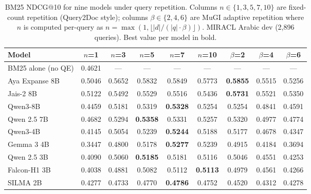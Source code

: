 \begin{table}[htbp]
    \centering
    \caption[BM25 NDCG@10 under query repetition, full sweep]{BM25 NDCG@10 for nine models under query repetition. Columns $n \in \{1, 3, 5, 7, 10\}$ are fixed-count repetition (Query2Doc style); columns $\beta \in \{2, 4, 6\}$ are MuGI adaptive repetition where $n$ is computed per-query as $n = \max(1, \lfloor |d| / (|q| \cdot \beta) \rfloor)$. MIRACL Arabic dev (2,896 queries). Best value per model in bold.}
    \label{tab:bm25_repetition}
    \setlength{\tabcolsep}{4pt}
    \begin{tabular}{@{}lcccccccc@{}}
        \toprule
        \textbf{Model} & $n$\textbf{=1} & $n$\textbf{=3} & $n$\textbf{=5} & $n$\textbf{=7} & $n$\textbf{=10} & $\beta$\textbf{=2} & $\beta$\textbf{=4} & $\beta$\textbf{=6} \\
        \midrule
        BM25 alone (no QE) & 0.4621 & --- & --- & --- & --- & --- & --- & --- \\
        Aya Expanse 8B & 0.5046 & 0.5652 & 0.5832 & 0.5849 & 0.5773 & \textbf{0.5855} & 0.5515 & 0.5256 \\
        Jais-2 8B & 0.5122 & 0.5492 & 0.5529 & 0.5516 & 0.5436 & \textbf{0.5731} & 0.5521 & 0.5350 \\
        Qwen3-8B & 0.4459 & 0.5181 & 0.5319 & \textbf{0.5328} & 0.5254 & 0.5254 & 0.4841 & 0.4591 \\
        Qwen 2.5 7B & 0.4682 & 0.5294 & \textbf{0.5358} & 0.5331 & 0.5257 & 0.5320 & 0.4977 & 0.4774 \\
        Qwen3-4B & 0.4145 & 0.5054 & 0.5239 & \textbf{0.5244} & 0.5188 & 0.5177 & 0.4678 & 0.4347 \\
        Gemma 3 4B & 0.3447 & 0.4800 & 0.5178 & \textbf{0.5277} & 0.5239 & 0.4915 & 0.4184 & 0.3694 \\
        Qwen 2.5 3B & 0.4090 & 0.5060 & \textbf{0.5185} & 0.5181 & 0.5116 & 0.5046 & 0.4551 & 0.4253 \\
        Falcon-H1 3B & 0.4038 & 0.4881 & 0.5082 & 0.5112 & \textbf{0.5113} & 0.4979 & 0.4561 & 0.4266 \\
        SILMA 2B & 0.4277 & 0.4733 & 0.4770 & \textbf{0.4786} & 0.4752 & 0.4520 & 0.4312 & 0.4278 \\
        \bottomrule
    \end{tabular}
\end{table}


